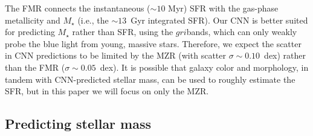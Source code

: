 \documentclass[fleqn,usenatbib]{mnras}
\newcommand{\sdssg}{\hbox{$g$}}
\newcommand{\sdssr}{\hbox{$r$}}
\newcommand{\sdssi}{\hbox{$i$}}
\newcommand{\mstar}{\hbox{$M_{\star}$}}
\newcommand{\ie}{i.e.}
\begin{document}
The FMR connects the instantaneous ($\sim 10$ Myr) SFR with the gas-phase metallicity \citep[$\sim 1$~Gyr timescales; see, e.g.,][]{2011ApJ...734...48L} and \mstar{} (\ie, the $\sim 13$~Gyr integrated SFR). Our CNN is better suited for predicting \mstar{} rather than SFR, using the \sdssg\sdssr\sdssi bands, which can only weakly probe the blue light from young, massive stars. Therefore, we expect the scatter in CNN predictions to be limited by the MZR (with scatter $\sigma \sim 0.10$~dex) rather than the FMR ($\sigma \sim 0.05$~dex). It is possible that galaxy color and morphology, in tandem with CNN-predicted stellar mass, can be used to roughly estimate the SFR, but in this paper we will focus on only the MZR.


\subsection{Predicting stellar mass}
\end{document}
